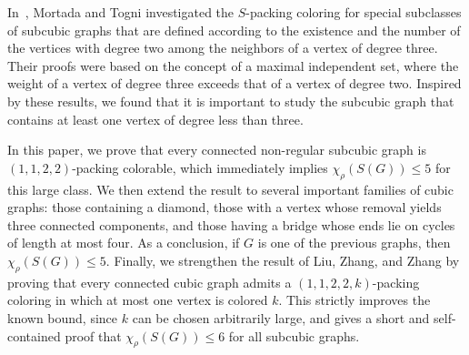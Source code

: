 \documentclass[12pt, oneside]{scrartcl}
\begin{document}
In~\cite{26,27,mai1}, Mortada and Togni investigated the $S$-packing coloring for special subclasses of subcubic graphs that are defined according to the existence and the number of the vertices with degree two among the neighbors of a vertex of degree three. Their proofs were based on the concept of a maximal independent set, where the weight of a vertex of degree three exceeds that of a vertex of degree two. Inspired by these results, we found that it is important to study the subcubic graph that contains at least one vertex of degree less than three. 

In this paper, we prove that every connected non-regular subcubic graph is $(1,1,2,2)$-packing colorable, which immediately implies $\chi_\rho(S(G)) \leq 5$ for this large class. We then extend the result to several important families of cubic graphs: those containing a diamond, those with a vertex whose removal yields three connected components, and those having a bridge whose ends lie on cycles of length at most four. As a conclusion, if $G$ is one of the previous graphs, then $\chi_{\rho}(S(G))\leq 5$. Finally, we strengthen the result of Liu, Zhang, and Zhang \cite{LZZ24} by proving that every connected cubic graph admits a $(1,1,2,2,k)$-packing coloring in which at most one vertex is colored $k$. This strictly improves the known bound, since $k$ can be chosen arbitrarily large, and gives a short and self-contained proof that $\chi_\rho(S(G)) \leq 6$ for all subcubic graphs.
\end{document}
